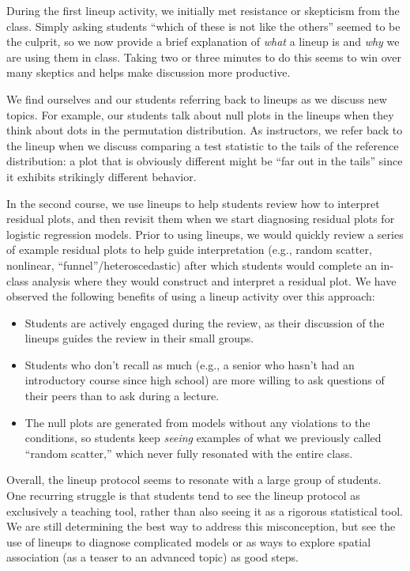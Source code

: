 \documentclass[12pt]{article}
\providecommand{\tightlist}{%
  \setlength{\itemsep}{0pt}\setlength{\parskip}{0pt}}
\begin{document}
During the first lineup activity, we initially met resistance or
skepticism from the class. Simply asking students ``which of these is
not like the others'' seemed to be the culprit, so we now provide a
brief explanation of \emph{what} a lineup is and \emph{why} we are using
them in class. Taking two or three minutes to do this seems to win over
many skeptics and helps make discussion more productive.

We find ourselves and our students referring back to lineups as we
discuss new topics. For example, our students talk about null plots in
the lineups when they think about dots in the permutation distribution.
As instructors, we refer back to the lineup when we discuss comparing a
test statistic to the tails of the reference distribution: a plot that
is obviously different might be ``far out in the tails'' since it
exhibits strikingly different behavior.

In the second course, we use lineups to help students review how to
interpret residual plots, and then revisit them when we start diagnosing
residual plots for logistic regression models. Prior to using lineups,
we would quickly review a series of example residual plots to help guide
interpretation (e.g., random scatter, nonlinear,
``funnel''/heteroscedastic) after which students would complete an
in-class analysis where they would construct and interpret a residual
plot. We have observed the following benefits of using a lineup activity
over this approach:

\begin{itemize}
\tightlist
\item
  Students are actively engaged during the review, as their discussion
  of the lineups guides the review in their small groups.
\item
  Students who don't recall as much (e.g., a senior who hasn't had an
  introductory course since high school) are more willing to ask
  questions of their peers than to ask during a lecture.
\item
  The null plots are generated from models without any violations to the
  conditions, so students keep \emph{seeing} examples of what we
  previously called ``random scatter,'' which never fully resonated with
  the entire class.
\end{itemize}

Overall, the lineup protocol seems to resonate with a large group of
students. One recurring struggle is that students tend to see the lineup
protocol as exclusively a teaching tool, rather than also seeing it as a
rigorous statistical tool. We are still determining the best way to
address this misconception, but see the use of lineups to diagnose
complicated models or as ways to explore spatial association (as a
teaser to an advanced topic) as good steps.
\end{document}
